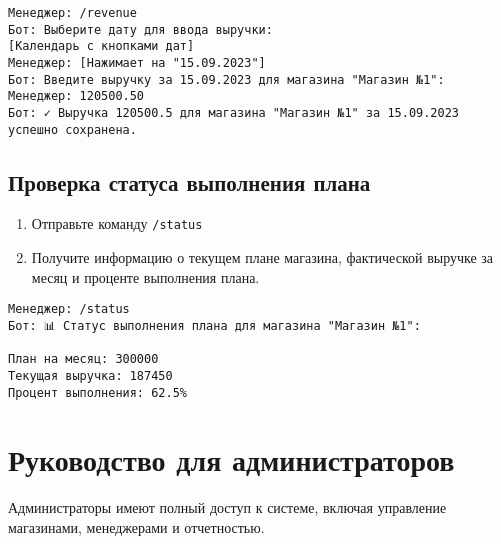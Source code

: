 \documentclass[a4paper,12pt]{article}
\begin{document}
\begin{tcolorbox}[colback=blue!5, title=Пример ввода выручки]
\begin{verbatim}
Менеджер: /revenue
Бот: Выберите дату для ввода выручки:
[Календарь с кнопками дат]
Менеджер: [Нажимает на "15.09.2023"]
Бот: Введите выручку за 15.09.2023 для магазина "Магазин №1":
Менеджер: 120500.50
Бот: ✓ Выручка 120500.5 для магазина "Магазин №1" за 15.09.2023 успешно сохранена.
\end{verbatim}
\end{tcolorbox}

\subsection{Проверка статуса выполнения плана}
\begin{enumerate}
    \item Отправьте команду \texttt{/status}
    \item Получите информацию о текущем плане магазина, фактической выручке за месяц и проценте выполнения плана.
\end{enumerate}

\begin{tcolorbox}[colback=blue!5, title=Пример просмотра статуса]
\begin{verbatim}
Менеджер: /status
Бот: 📊 Статус выполнения плана для магазина "Магазин №1":

План на месяц: 300000
Текущая выручка: 187450
Процент выполнения: 62.5%
\end{verbatim}
\end{tcolorbox}

\section{Руководство для администраторов}

Администраторы имеют полный доступ к системе, включая управление магазинами, менеджерами и отчетностью.
\end{document}
